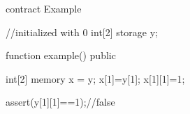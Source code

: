 \begin{soliditybox}
contract Example {
  //initialized with 0
  int[2] storage y;
        
  function example() public {
    int[2] memory x = y;
    x[1]=y[1];
    x[1][1]=1;
        
    assert(y[1][1]==1);//false
  }
}
\end{soliditybox}